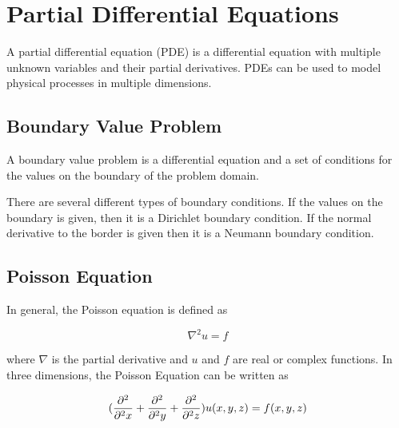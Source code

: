 \section{Partial Differential Equations}

A partial differential equation (PDE) is a differential equation with multiple 
unknown variables and their partial derivatives. PDEs can be used to model physical 
processes in multiple dimensions. 

\subsection{Boundary Value Problem}

A boundary value problem is a differential equation and a set of conditions for
the values on the boundary of the problem domain.

There are several different types of boundary conditions. If the values on the
boundary is given, then it is a Dirichlet boundary condition. If the normal
derivative to the border is given then it is a Neumann boundary
condition\cite{Kreyszig}.

\subsection{Poisson Equation}

In general, the Poisson equation is defined as 

$$\nabla^2 u = f$$

where $\nabla$ is the partial derivative and $u$ and $f$ are real or complex 
functions. In three dimensions, the Poisson Equation can be written as 

$$(\frac{\partial^2}{\partial^2 x} + \frac{\partial^2}{\partial^2 y} + \frac{\partial^2}{\partial^2 z}) u(x, y, z) = f(x, y, z)$$
